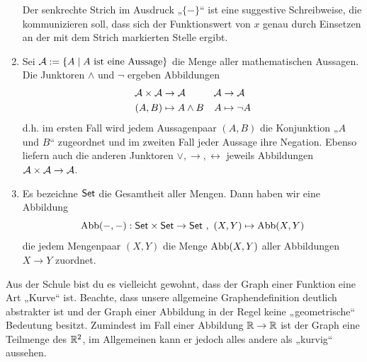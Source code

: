 \begin{bsp}
\begin{enumerate}
        Der senkrechte Strich im Ausdruck „$\{-\}$“ ist eine suggestive Schreibweise, die kommunizieren soll, dass sich der Funktionswert von $x$ genau durch Einsetzen an der mit dem Strich markierten Stelle ergibt.
        \item Sei $\mathcal A:=\{A\mid A\ \text{ist eine Aussage}\}$ die Menge aller mathematischen Aussagen. Die Junktoren $\land$ und $\neg$ ergeben Abbildungen
        \begin{align*}
            \mathcal A\times \mathcal A & \to \mathcal A & \mathcal A & \to \mathcal A \\
            (A,B) & \mapsto A\land B & A& \mapsto \neg A
        \end{align*}
        d.h. im ersten Fall wird jedem Aussagenpaar $(A,B)$ die Konjunktion „$A$ und $B$“ zugeordnet und im zweiten Fall jeder Aussage ihre Negation. Ebenso liefern auch die anderen Junktoren $\lor,\to,\leftrightarrow$ jeweils Abbildungen $\mathcal A\times\mathcal A\to \mathcal A$.
        \item Es bezeichne $\mathsf{Set}$ die Gesamtheit aller Mengen. Dann haben wir eine Abbildung
            \[ \operatorname{Abb}(-,-) : \mathsf{Set} \times \mathsf{Set} \to \mathsf{Set} \ ,\ (X,Y) \mapsto \operatorname{Abb}(X,Y) \]
        die jedem Mengenpaar $(X,Y)$ die Menge $\operatorname{Abb}(X,Y)$ aller Abbildungen $X\to Y$ zuordnet.
    \end{enumerate}
    Aus der Schule bist du es vielleicht gewohnt, dass der Graph einer Funktion eine Art „Kurve“ ist. Beachte, dass unsere allgemeine Graphendefinition deutlich abstrakter ist und der Graph einer Abbildung in der Regel keine „geometrische“ Bedeutung besitzt. Zumindest im Fall einer Abbildung $\mathbb R\to \mathbb R$ ist der Graph eine Teilmenge des $\mathbb R^2$, im Allgemeinen kann er jedoch alles andere als „kurvig“ aussehen.
\end{bsp}


